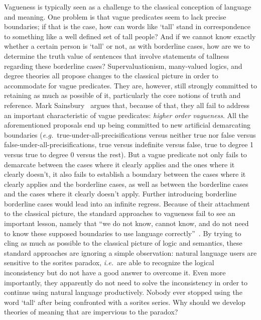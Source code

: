 \documentclass[a4paper]{article}
\begin{document}
Vagueness is typically seen as a challenge to the classical conception of language and meaning.
One problem is that vague predicates seem to lack precise boundaries; if that is the case, how can words like `tall' stand in correspondence to something like a well defined set of tall people?
And if we cannot know exactly whether a certain person is `tall' or not, as with borderline cases, how are we to determine the truth value of sentences that involve statements of tallness regarding these borderline cases?
Supervaluationism, many-valued logics, and degree theories all propose changes to the classical picture in order to accommodate for vague predicates.
They are, however, still strongly committed to retaining as much as possible of it, particularly the core notions of truth and reference.
Mark Sainsbury~\parencite*{sainsbury_concepts_1999} argues that, because of that, they all fail to address an important characteristic of vague predicates: \emph{higher order vagueness}.
All the aforementioned proposals end up being committed to new artificial demarcating boundaries (\emph{e.g.}~true-under-all-precisifications versus neither true nor false versus false-under-all-precisifications, true versus indefinite versus false, true to degree 1 versus true to degree 0 versus the rest).
But a vague predicate not only fails to demarcate between the cases where it clearly applies and the ones where it clearly doesn't, it also fails to establish a boundary between the cases where it clearly applies and the borderline cases, as well as between the borderline cases and the cases where it clearly doesn't apply.
Further introducing borderline borderline cases would lead into an infinite regress.
Because of their attachment to the classical picture, the standard approaches to vagueness fail to see an important lesson, namely that ``we do not know, cannot know, and do not need to know these supposed boundaries to use language correctly''~\parencite*[256]{sainsbury_concepts_1999}.
By trying to cling as much as possible to the classical picture of logic and semantics, these standard approaches are ignoring a simple observation: natural language users are sensitive to the sorites paradox, \emph{i.e.}~are able to recognize the logical inconsistency but do not have a good answer to overcome it.
Even more importantly, they apparently do not need to solve the inconsistency in order to continue using natural language productively.
Nobody ever stopped using the word `tall` after being confronted with a sorites series.
Why should we develop theories of meaning that are impervious to the paradox?
\end{document}
